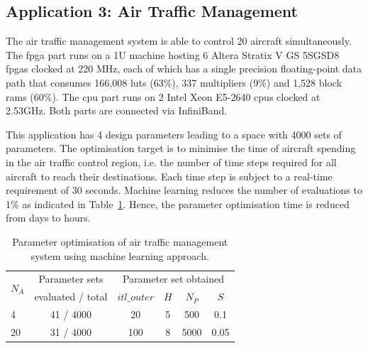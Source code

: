 \subsection{Application 3: Air Traffic Management}

The air traffic management system is able to control 20 aircraft simultaneously.
The \gls{fpga} part runs on a 1U machine hosting 6 Altera Stratix V GS 5SGSD8 \glspl{fpga} clocked at 220 MHz, 
each of which has a single precision floating-point data path that consumes 166,008 \glspl{lut} (63\%), 337 multipliers (9\%) and 1,528 block \glspl{ram} (60\%).
The \gls{cpu} part runs on 2 Intel Xeon E5-2640 \glspl{cpu} clocked at 2.53GHz.
Both parts are connected via InfiniBand.

This application has 4 design parameters leading to a space with 4000 sets of parameters.
The optimisation target is to minimise the time of aircraft spending in the air traffic control region,
i.e. the number of time steps required for all aircraft to reach their destinations.
Each time step is subject to a real-time requirement of 30 seconds.
Machine learning reduces the number of evaluations to 1\% as indicated in Table~\ref{tab:dse}.
Hence, the parameter optimisation time is reduced from days to hours.

\begin{table}[ht]
	\begin{spacing}{1.0}
	\caption{Parameter optimisation of air traffic management system using machine learning approach.}
	\label{tab:dse}
	\centering
	\smallskip
	\begin{threeparttable}
		\begin{tabular}{l|c|c c c c}
			\hline
			\multirow{2}{*}{$N_A$}			& Parameter	sets		& \multicolumn{4}{|c}{Parameter set obtained} \\
			\cline{3-6}
																	& evaluated / total					& $itl\_outer$  		& $H$ & $N_P$ & $S$ \\
			\hline
			\hline
			4 													& 41 / 4000											& 20								&	5		&	500	  & 0.1 \\
			20													& 31 / 4000 											& 100								&	8		&	5000	& 0.05 \\
			\hline
		\end{tabular}
	\end{threeparttable}
	\end{spacing}
\end{table}

